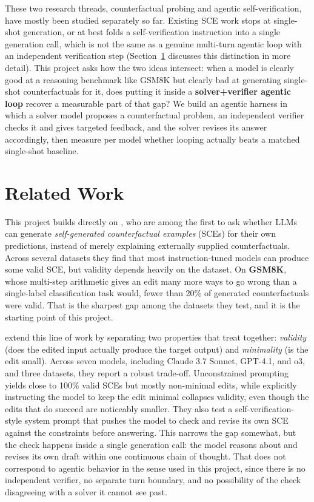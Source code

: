 \documentclass[twoside,twocolumn,10pt]{article}
\begin{document}
These two research threads, counterfactual probing and agentic self-verification, have mostly been studied separately so far. Existing SCE work stops at single-shot generation, or at best folds a self-verification instruction into a single generation call, which is not the same as a genuine multi-turn agentic loop with an independent verification step (Section~\ref{sec:related-work} discusses this distinction in more detail). This project asks how the two ideas intersect: when a model is clearly good at a reasoning benchmark like GSM8K but clearly bad at generating single-shot counterfactuals for it, does putting it inside a \textbf{solver+verifier agentic loop} recover a measurable part of that gap? We build an agentic harness in which a solver model proposes a counterfactual problem, an independent verifier checks it and gives targeted feedback, and the solver revises its answer accordingly, then measure per model whether looping actually beats a matched single-shot baseline.

\section{Related Work}
\label{sec:related-work}
\fontsize{11}{13}\selectfont
This project builds directly on \textcite{dehghanighobadi2025llmsexplaincounterfactually}, who are among the first to ask whether LLMs can generate \textit{self-generated counterfactual examples} (SCEs) for their own predictions, instead of merely explaining externally supplied counterfactuals. Across several datasets they find that most instruction-tuned models can produce some valid SCE, but validity depends heavily on the dataset. On \textbf{GSM8K}, whose multi-step arithmetic gives an edit many more ways to go wrong than a single-label classification task would, fewer than 20\% of generated counterfactuals were valid. That is the sharpest gap among the datasets they test, and it is the starting point of this project.

\textcite{mayne2025llmsdontknowdecision} extend this line of work by separating two properties that \textcite{dehghanighobadi2025llmsexplaincounterfactually} treat together: \textit{validity} (does the edited input actually produce the target output) and \textit{minimality} (is the edit small). Across seven models, including Claude 3.7 Sonnet, GPT-4.1, and o3, and three datasets, they report a robust trade-off. Unconstrained prompting yields close to 100\% valid SCEs but mostly non-minimal edits, while explicitly instructing the model to keep the edit minimal collapses validity, even though the edits that do succeed are noticeably smaller. They also test a self-verification-style system prompt that pushes the model to check and revise its own SCE against the constraints before answering. This narrows the gap somewhat, but the check happens inside a single generation call: the model reasons about and revises its own draft within one continuous chain of thought. That does not correspond to agentic behavior in the sense used in this project, since there is no independent verifier, no separate turn boundary, and no possibility of the check disagreeing with a solver it cannot see past.
\end{document}
